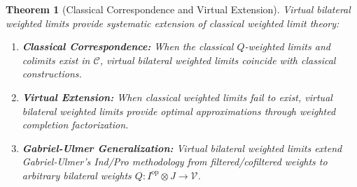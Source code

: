 \documentclass[11pt]{article}
\theoremstyle{plain}
\newtheorem{theorem}{Theorem}[section]
\theoremstyle{definition}
\theoremstyle{remark}
\newcommand{\V}{\mathcal{V}}
\newcommand{\C}{\mathcal{C}}
\newcommand{\op}{\mathrm{op}}
\begin{document}
\begin{theorem}[Classical Correspondence and Virtual Extension]\label{thm:virtual-correspondence}
Virtual bilateral weighted limits provide systematic extension of classical weighted limit theory:

\begin{enumerate}
\item \textbf{Classical Correspondence:} When the classical $Q$-weighted limits and colimits exist in $\C$, virtual bilateral weighted limits coincide with classical constructions.

\item \textbf{Virtual Extension:} When classical weighted limits fail to exist, virtual bilateral weighted limits provide optimal approximations through weighted completion factorization.

\item \textbf{Gabriel-Ulmer Generalization:} Virtual bilateral weighted limits extend Gabriel-Ulmer's Ind/Pro methodology from filtered/cofiltered weights to arbitrary bilateral weights $Q : I^{\op} \otimes J \to \V$.
\end{enumerate}
\end{theorem}
\end{document}
